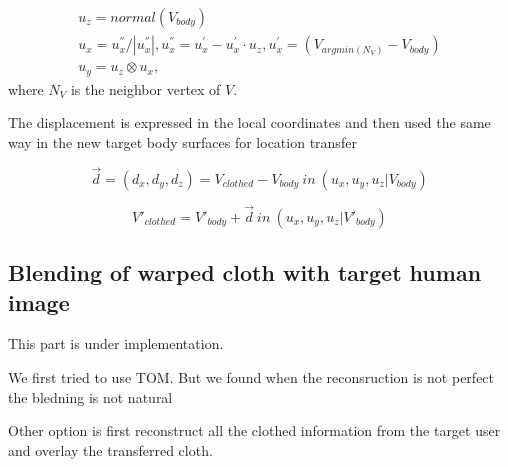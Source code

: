 \documentclass[runningheads]{llncs}
\begin{document}
\begin{align}
 u_{z} =  normal(V_{body})  \\
 u_{x} = u^{''}_{x}/ |u^{''}_{x} |, 
 u^{''}_{x} = u^{'}_{x} - u^{'}_{x} \cdot u_{z}, 
 u^{'}_{x} = (V_{argmin(N_V) } - V_{body}) \\
 u_{y}  =  u_z \otimes u_x,
\end{align} 
 where $N_V$ is the neighbor vertex of $V$.
 

The displacement is expressed in the local coordinates and then used the same way in the new target body surfaces for location transfer

\begin{equation}
\overrightarrow{d} = (d_x, d_y, d_z) = V_{clothed} - V_{body} \: in \: (u_x, u_y, u_z | V_{body})
\end{equation}


\begin{equation}
 V'_{clothed} = V'_{body} + \overrightarrow{d} \: in \: (u_x, u_y, u_z | V'_{body})
\end{equation}



\subsection{Blending of warped cloth with target human image}


This part is under implementation.

We first tried to use TOM. But we found when the reconsruction is not perfect the bledning is not natural 

Other option is first reconstruct all the clothed information from the target user and overlay the transferred cloth.
\end{document}
